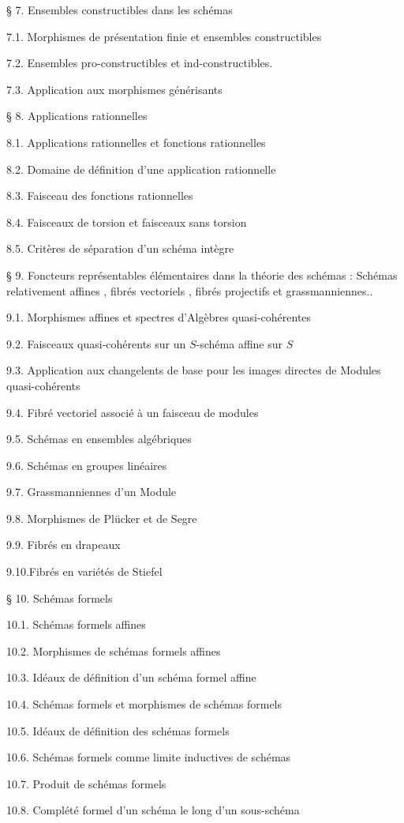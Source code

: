 
\noindent § 7. Ensembles constructibles dans les schémas\dotfill

7.1. Morphismes de présentation finie et ensembles constructibles\dotfill

7.2. Ensembles pro-constructibles et ind-constructibles.

7.3. Application aux morphismes générisants\dotfill

\noindent § 8. Applications rationnelles \dotfill

8.1. Applications rationnelles et fonctions rationnelles

8.2. Domaine de définition d'une application rationnelle

8.3. Faisceau des fonctions rationnelles\dotfill

8.4. Faisceaux de torsion et faisceaux sans torsion\dotfill

8.5. Critères de séparation d'un schéma intègre\dotfill

\noindent § 9. Foncteurs représentables élémentaires dans la théorie des schémas : Schémas relativement affines , fibrés vectoriels , fibrés projectifs et grassmanniennes..

9.1. Morphismes affines et spectres d'Algèbres quasi-cohérentes\dotfill

9.2. Faisceaux quasi-cohérents sur un $S$-schéma affine sur $S$\dotfill

9.3. Application aux changelents de base pour les images directes de Modules quasi-cohérents\dotfill

9.4. Fibré vectoriel associé à un faisceau de modules\dotfill

9.5. Schémas en ensembles algébriques\dotfill

9.6. Schémas en groupes linéaires\dotfill

9.7. Grassmanniennes d'un Module\dotfill

9.8. Morphismes de Plücker et de Segre\dotfill

9.9. Fibrés en drapeaux\dotfill

9.10.Fibrés en variétés de Stiefel\dotfill

\noindent § 10. Schémas formels\dotfill

10.1. Schémas formels affines\dotfill

10.2. Morphismes de schémas formels affines\dotfill

10.3. Idéaux de définition d'un schéma formel affine\dotfill

10.4. Schémas formels et morphismes de schémas formels\dotfill

10.5. Idéaux de définition des schémas formels\dotfill

10.6. Schémas formels comme limite inductives de schémas

10.7. Produit de schémas formels\dotfill

10.8. Complété formel d'un schéma le long d'un sous-schéma\dotfill
